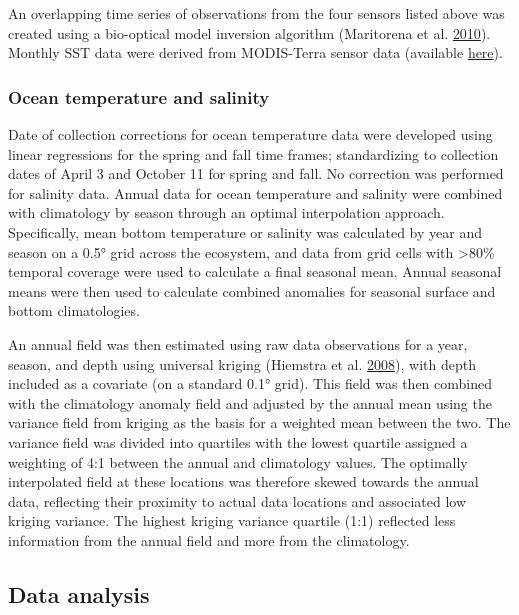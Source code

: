 \documentclass[
]{book}
\begin{document}
An overlapping time series of observations from the four sensors listed above was created using a bio-optical model inversion algorithm (Maritorena et al. \protect\hyperlink{ref-Maritorena2010}{2010}). Monthly SST data were derived from MODIS-Terra sensor data (available \href{https://oceancolor.gsfc.nasa.gov/data/terra/}{here}).

\hypertarget{ocean-temperature-and-salinity-1}{%
\subsubsection{Ocean temperature and salinity}\label{ocean-temperature-and-salinity-1}}

Date of collection corrections for ocean temperature data were developed using linear regressions for the spring and fall time frames; standardizing to collection dates of April 3 and October 11 for spring and fall. No correction was performed for salinity data. Annual data for ocean temperature and salinity were combined with climatology by season through an optimal interpolation approach. Specifically, mean bottom temperature or salinity was calculated by year and season on a 0.5° grid across the ecosystem, and data from grid cells with \textgreater{}80\% temporal coverage were used to calculate a final seasonal mean. Annual seasonal means were then used to calculate combined anomalies for seasonal surface and bottom climatologies.

An annual field was then estimated using raw data observations for a year, season, and depth using universal kriging (Hiemstra et al. \protect\hyperlink{ref-automap}{2008}), with depth included as a covariate (on a standard 0.1° grid). This field was then combined with the climatology anomaly field and adjusted by the annual mean using the variance field from kriging as the basis for a weighted mean between the two. The variance field was divided into quartiles with the lowest quartile assigned a weighting of 4:1 between the annual and climatology values. The optimally interpolated field at these locations was therefore skewed towards the annual data, reflecting their proximity to actual data locations and associated low kriging variance. The highest kriging variance quartile (1:1) reflected less information from the annual field and more from the climatology.

\hypertarget{data-analysis-24}{%
\subsection{Data analysis}\label{data-analysis-24}}
\end{document}
